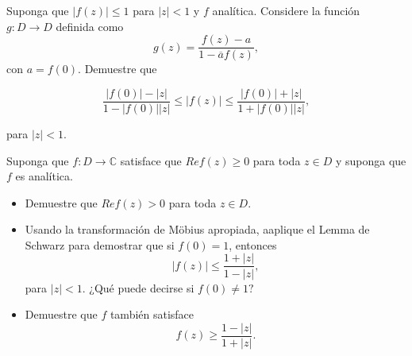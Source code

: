 \documentclass[12pt]{article}
\newcommand{\C}{\mathbb{C}}
\newenvironment{problem}[2][Problema]{\begin{trivlist}
\item[\hskip \labelsep {\bfseries #1}\hskip \labelsep {\bfseries #2.}]}{\end{trivlist}}
\begin{document}
\begin{problem}{1. pp. 132} Suponga que $\lvert f(z) \rvert \leq 1$ para $\lvert z \rvert < 1$ y $f$ analítica. Considere la función $g: D \rightarrow D$ definida como 
$$g(z) = \frac{f(z) - a}{1-\overline{a} f(z)},$$
con $a = f(0).$ Demuestre que 

$$\frac{\lvert f(0)\rvert - \lvert z\rvert}{1-\lvert f(0) \rvert \lvert z \rvert} \leq \lvert f(z) \rvert \leq \frac{\lvert f(0) \rvert + \lvert z \rvert}{1 + \lvert f(0) \rvert \lvert z \rvert},$$

para $\lvert z \rvert < 1.$
\end{problem}

\begin{problem}{3. pp. 133} Suponga que $f: D \rightarrow \C$ satisface que $Re f(z) \geq 0$ para toda $z \in D$ y suponga que $f$ es analítica. 

\begin{itemize}
    \item[(a)] Demuestre que $Re f(z) > 0$ para toda $z \in D$. 
    \item[(b)] Usando la transformación de Möbius apropiada, aaplique el Lemma de Schwarz para demostrar que si $f(0) = 1 $, entonces 
    $$\lvert f(z) \rvert \leq \frac{1+\lvert z \rvert}{1 - \lvert z \rvert}, $$
    para $\lvert z \rvert < 1.$ ¿Qué puede decirse si $f(0) \neq 1?$
    \item[(c)] Demuestre que $f$ también satisface
    $$ f(z) \geq \frac{1 - \lvert z \rvert}{1+\lvert z \rvert}. $$
    
\end{itemize}
\end{problem}
\printbibliography
\end{document}
